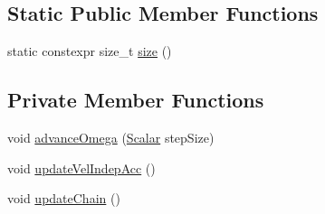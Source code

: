 \subsection*{Static Public Member Functions}
\begin{DoxyCompactItemize}
\item 
static constexpr size\+\_\+t \mbox{\hyperlink{class_a_rchain_3_01_newtonian_3_01typename_01_evolved_data_1_1_scalar_01_4_00_01_evolved_data_00_01_regularitor_01_4_a928601b10d9a9e5ab02f36cf11efa263}{size}} ()
\end{DoxyCompactItemize}
\subsection*{Private Member Functions}
\begin{DoxyCompactItemize}
\item 
void \mbox{\hyperlink{class_a_rchain_3_01_newtonian_3_01typename_01_evolved_data_1_1_scalar_01_4_00_01_evolved_data_00_01_regularitor_01_4_a8427d55e9b05fca4a1db2b9024940e06}{advance\+Omega}} (\mbox{\hyperlink{class_a_rchain_3_01_newtonian_3_01typename_01_evolved_data_1_1_scalar_01_4_00_01_evolved_data_00_01_regularitor_01_4_a2c77dc1b58a25ac5c6ee95dd7809f693}{Scalar}} step\+Size)
\item 
void \mbox{\hyperlink{class_a_rchain_3_01_newtonian_3_01typename_01_evolved_data_1_1_scalar_01_4_00_01_evolved_data_00_01_regularitor_01_4_a2b11ca856564416ed6727c716ed284a8}{update\+Vel\+Indep\+Acc}} ()
\item 
void \mbox{\hyperlink{class_a_rchain_3_01_newtonian_3_01typename_01_evolved_data_1_1_scalar_01_4_00_01_evolved_data_00_01_regularitor_01_4_acbe31e9aa918e4f80a2763e16f0bb7bc}{update\+Chain}} ()
\end{DoxyCompactItemize}
